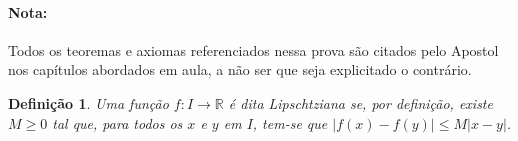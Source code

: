 \documentclass{IMTexam}
\author{Isabella B. Amaral}
\date{9 de janeiro}
\newtheorem{definition}{Definição}
\begin{document}
	
	\maketitle
	
	\paragraph{Nota:} Todos os teoremas e axiomas referenciados nessa prova são citados pelo Apostol nos capítulos abordados em aula, a não ser que seja explicitado o contrário.
	
	\begin{definition}
		Uma função $ f:I\longrightarrow\mathbb{R} $ é dita Lipschtziana se, por definição, existe $ M\geqslant 0 $ tal que, para todos os $ x $ e $ y $ em $ I $, tem-se que $ |f(x)-f(y)|\leqslant M|x-y| $.
	\end{definition}	
\end{document}
